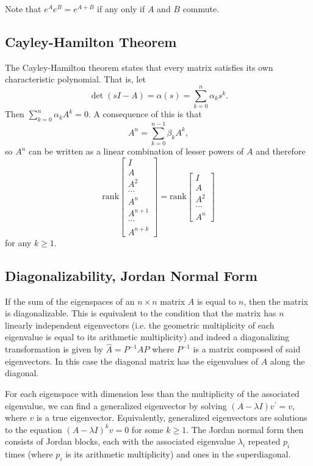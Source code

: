 \documentclass{report}
\begin{document}
Note that $e^{A} e^{B} = e^{A + B}$ if any only if $A$ and $B$ commute.

\subsection{Cayley-Hamilton Theorem}
The Cayley-Hamilton theorem states that every matrix satisfies its own
characteristic polynomial. That is, let
$$
\det (sI - A) = \alpha(s) = \sum_{k=0}^{n} \alpha_k s^k.
$$
Then $\sum_{k=0}^{n} \alpha_k A^k = 0$. A consequence of this is
that
$$
A^n = \sum_{k=0}^{n-1} \beta_k A^k,
$$
so $A^n$ can be written as a linear combination of lesser powers of
$A$ and therefore
$$
\mathrm{rank}
\left[\begin{array}{c}
  I      \\
  A      \\
  A^2    \\
  \cdots \\
  A^n    \\
  A^{n+1} \\
  \cdots \\
  A^{n+k}
\end{array}\right]
=
\mathrm{rank}
\left[\begin{array}{c}
  I      \\
  A      \\
  A^2    \\
  \cdots \\
  A^n
\end{array}\right]
$$
for any $k \geq 1$.

\subsection{Diagonalizability, Jordan Normal Form}
If the sum of the eigenspaces of an $n \times n$ matrix $A$ is equal
to $n$, then the matrix is diagonalizable. This is equivalent to the
condition that the matrix has $n$ linearly independent eigenvectors
(i.e. the geometric multiplicity of each eigenvalue is equal to its
arithmetic multiplicity)
and indeed a diagonalizing transformation is given by
$\hat{A} = P^{-1} A P$ where $P^{-1}$ is a matrix composed of said
eigenvectors. In this case the diagonal matrix has the eigenvalues of
$A$ along the diagonal.

For each eigenspace with dimension less than the multiplicity of the
associated eigenvalue, we can find a generalized eigenvector by
solving $(A - \lambda I)v^\prime = v$, where $v$ is a true
eigenvector. Equivalently, generalized eigenvectors are solutions to
the equation $(A - \lambda I)^k v = 0$ for some $k \geq 1$. The Jordan
normal form then consists of Jordan blocks, each with the associated
eigenvalue $\lambda_i$ repeated $p_i$ times (where $p_i$ is its arithmetic
multiplicity) and ones in the superdiagonal.
\end{document}
